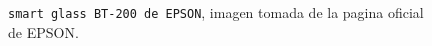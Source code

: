 \documentclass[jou]{apa6} %
\begin{document}
\begin{figure}[htb]
  \centering
\setlength\fboxsep{0pt}
\setlength\fboxrule{0.5pt}
  \caption{\footnotesize \texttt{smart glass BT-200 de EPSON}, imagen tomada de la pagina oficial de EPSON. }
  \label{fig:gafas}  
\end{figure}






\end{document}
